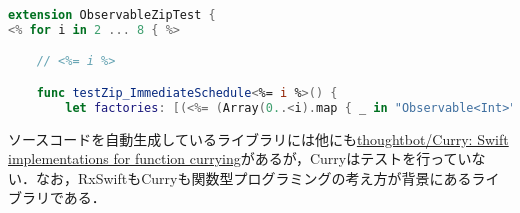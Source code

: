 \begin{lstlisting}[language=swift,caption=\href{https://github.com/ReactiveX/RxSwift/blob/b32a0f0d40656672783749d23e2984bf337adcec/Tests/RxSwiftTests/Observable+ZipTests+arity.tt}{{\sf zip}メソッドのテストテンプレート},label=lstlisting:ReactiveX/RxSwift:b32a0f0:Tests/RxSwiftTests/Observable+ZipTests+arity.tt:14-20,firstnumber=14]
extension ObservableZipTest {
<% for i in 2 ... 8 { %>

    // <%= i %>

    func testZip_ImmediateSchedule<%= i %>() {
        let factories: [(<%= (Array(0..<i).map { _ in "Observable<Int>" }).joined(separator: ", ") %>) -> Observable<Int>] =
\end{lstlisting}

ソースコードを自動生成しているライブラリには他にも\href{https://github.com/thoughtbot/Curry}{thoughtbot/Curry: Swift implementations for function currying}があるが，Curryはテストを行っていない．なお，RxSwiftもCurryも関数型プログラミングの考え方が背景にあるライブラリである．

